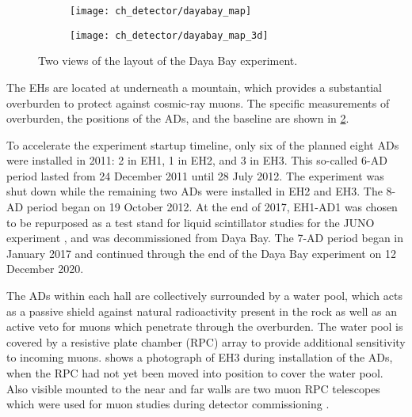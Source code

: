 \begin{figure}
    \centering
    \begin{subfigure}{0.49\textwidth}
        \texttt{[image: ch\_detector/dayabay\_map]}
    \end{subfigure}
    \begin{subfigure}{0.49\textwidth}
        \texttt{[image: ch\_detector/dayabay\_map\_3d]}
    \end{subfigure}
    \caption{Two views of the layout of the Daya Bay experiment.
    }
    \label{fig:layout}
\end{figure}

The EHs are located at underneath a mountain, which provides a substantial
overburden to protect against cosmic-ray muons.
The specific measurements of overburden, the positions of the ADs,
and the baseline are shown in \cref{tab:baselines}.

\begin{figure}
    \label{tab:baselines}
\end{figure}

To accelerate the experiment startup timeline,
only six of the planned eight ADs were installed in 2011:
2 in EH1, 1 in EH2, and 3 in EH3.
This so-called 6-AD period lasted from 24 December 2011 until 28 July 2012. %
The experiment was shut down while the remaining two ADs were installed
in EH2 and EH3.
The 8-AD period began on 19 October 2012.
At the end of 2017, EH1-AD1 was chosen to be repurposed as a test stand
for liquid scintillator studies for the JUNO experiment \cite{junoproposal2016},
and was decommissioned from Daya Bay.
The 7-AD period began in January 2017 and continued through the end of
the Daya Bay experiment on 12 December 2020.

The ADs within each hall are collectively surrounded by a water pool,
which acts as a passive shield against natural radioactivity present in the rock
as well as an active veto for muons which penetrate through the overburden.
The water pool is covered by a resistive plate chamber (RPC) array
to provide additional sensitivity to incoming muons.
 shows a photograph of EH3 during installation of the ADs,
when the RPC had not yet been moved into position to cover the water pool.
Also visible mounted to the near and far walls are two muon RPC telescopes
which were used for muon studies during detector commissioning \cite{muonsystem2015}.

